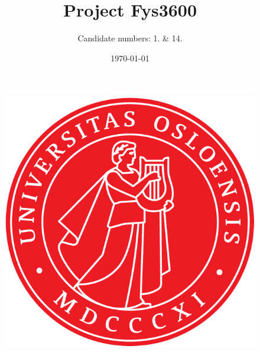 \documentclass[norsk,a4paper,11pt]{article}
\title{Project Fys3600}
\author{Candidate numbers: 1. \& 14.}
\date{\today}
\begin{document}
\maketitle

\begin{figure}[H]
	\begin{center}
		\includegraphics[scale=1.0]{Figures/uiosegl.png}
	\end{center}
\end{figure}



\newpage

\tableofcontents
\end{document}
